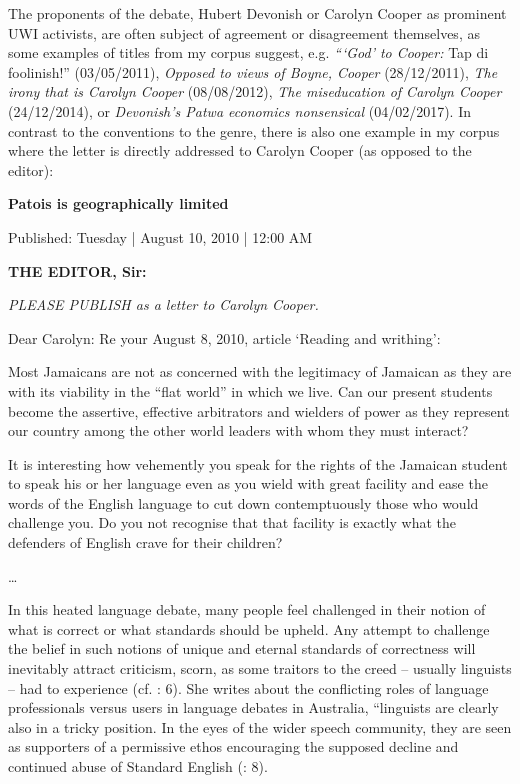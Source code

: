 \documentclass[output=paper,colorlinks,citecolor=brown]{langscibook}
\begin{document}
The proponents of the debate, Hubert Devonish or Carolyn Cooper as prominent UWI activists, are often subject of agreement or disagreement themselves, as some examples of titles from my corpus suggest, e.g. \textit{“`God' to Cooper:} Tap di foolinish!” (03/05/2011), \textit{Opposed to views of Boyne, Cooper} (28/12/2011), \textit{The irony that is Carolyn Cooper} (08/08/2012), \textit{The miseducation of Carolyn Cooper} (24/12/2014), or \textit{Devonish's Patwa economics nonsensical} (04/02/2017). In contrast to the conventions to the genre, there is also one example in my corpus where the letter is directly addressed to Carolyn Cooper (as opposed to the editor):


\ea
\textbf{Patois is geographically limited }

Published: Tuesday | August 10, 2010 | 12:00 AM


\textbf{THE EDITOR, Sir:}

\textit{PLEASE PUBLISH as a letter to Carolyn Cooper.}

Dear Carolyn: Re your August 8, 2010, article `Reading and writhing':

Most Jamaicans are not as concerned with the legitimacy of Jamaican as they are with its viability in the ``flat world'' in which we live. Can our present students become the assertive, effective arbitrators and wielders of power as they represent our country among the other world leaders
with whom they must interact?

It is interesting how vehemently you speak for the rights of the Jamaican student to speak his or her language even as you wield with great facility and ease the words of the English language to cut down contemptuously those who would challenge you. Do you not recognise that that facility is
exactly what the defenders of English crave for their children?

…
\z

In this heated language debate, many people feel challenged in their notion of what is correct or what standards should be upheld. Any attempt to challenge the belief in such notions of unique and eternal standards of correctness will inevitably attract criticism, scorn, as some traitors to the creed -- usually linguists -- had to experience (cf. \citealt{burridge2010linguistic}: 6). She writes about the conflicting roles of language professionals versus users in language debates in Australia, “linguists are clearly also in a tricky position. In the eyes of the wider speech community, they are seen as supporters of a permissive ethos encouraging the supposed decline and continued abuse of Standard English (\citealt{burridge2010linguistic}: 8).
\end{document}
